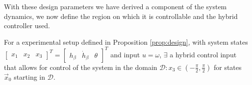 With these design parameters we have derived a component of the system dynamics, we now define the region on which it is controllable and the hybrid controller used. 

\begin{theorem}\label{thrm:con}
For a experimental setup defined in Proposition \ref{prop:design}, with system states $ \begin{bmatrix} x_1 & x_2 & x_3 \end{bmatrix}^T = \begin{bmatrix} h_{\beta} & \dot{h}_{\beta} & \theta \end{bmatrix}^T$ and input $u = \omega$, $\exists$ a hybrid control input that allows for control of the system in the domain $\mathcal{D}: x_3 \in (-\frac{\pi}{2}, \frac{\pi}{2})$ for states $\vec{x}_0$ starting in $\mathcal{D}$. 
\end{theorem}
